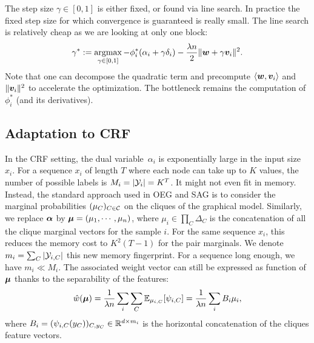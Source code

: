 The step size $\gamma \in [0,1]$  is either fixed, or found via line search.
In practice the fixed step size for which convergence is guaranteed is really small.
The line search is relatively cheap as we are looking at only one block:
\begin{equation}\label{line search equation}
	\gamma^*
	:= \operatorname*{argmax}_{\gamma \in [0,1]} - \phi^*_i(\alpha_i + \gamma \delta_i)
	- \frac{\lambda n}{2} \| \boldsymbol{w} + \gamma \bm v_i \|^2.
\end{equation}
Note that one can decompose the quadratic term and precompute $ \langle \boldsymbol{w}, \bm v_i \rangle$ and $\| \bm v_i \|^2 $ to accelerate the optimization.
The bottleneck remains the computation of $\phi^*_i$ (and its derivatives).




\subsection{Adaptation to CRF}
In the CRF setting, the dual variable~$\alpha_i$ is exponentially large in the input size~$x_i$.
For a sequence $x_i$ of length $T$ where each node can take up to $K$ values, the number of possible labels is $M_i = |{\mathcal Y}_i | = K^{T}$.
It might not even fit in memory.
Instead, the standard approach used in OEG and SAG is to consider the marginal probabilities $(\mu_C)_{C \in {\mathcal C}}$ on the cliques of the graphical model.
Similarly, we replace $\boldsymbol{\alpha}$ by $\boldsymbol{\mu} = (\mu_1, \cdots, \mu_n)$, where $\mu_i \in \prod_C \Delta_{C}$ is the concatenation of all the clique marginal vectors for the sample $i$.
For the same sequence $x_i$, this reduces the memory cost to $K^2(T-1)$ for the pair marginals.
We denote $m_i= \sum_C |{\mathcal Y}_{i, C} |$ this new memory fingerprint.
For a sequence long enough, we have $m_i \ll M_i$.
The associated weight vector can still be expressed as function of $\boldsymbol{\mu}$ thanks to the separability of the features:
\begin{equation}
	\label{weights from marginals}
	\hat w (\boldsymbol{\mu}) = \frac{1}{\lambda n} \sum_i \sum_C \mathbb E_{\mu_{i, C}}[\psi_{i, C}]
	= \frac{1}{\lambda n} \sum_i B_i \mu_i,
\end{equation}
where $B_i = (\psi_{i,C}(y_{C}) )_{C, y_C} \in \mathbb{R}^{d \times m_i}$ is the horizontal concatenation of the cliques feature vectors.

